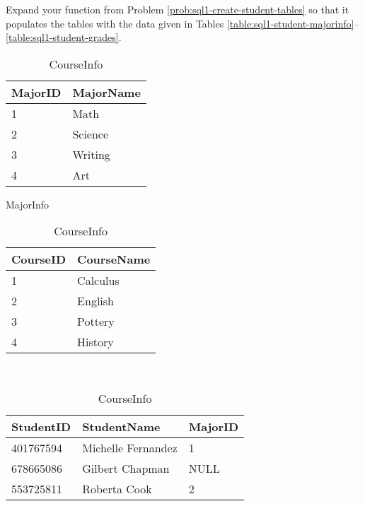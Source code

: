 \begin{problem} %
Expand your function from Problem \ref{prob:sql1-create-student-tables} so that it populates the tables with the data given in Tables \ref{table:sql1-student-majorinfo}--\ref{table:sql1-student-grades}.

\begin{table}[H]
\begin{subtable}{0.55\textwidth}
    \centering
    \begin{subtable}{.45\textwidth}
        \centering
        \footnotesize
        \begin{tabular}{|l|l|}
            \hline MajorID & MajorName \\ \hline
            1 & Math \\
            2 & Science \\
            3 & Writing \\
            4 & Art \\ \hline
        \end{tabular}
        \caption{MajorInfo}
        \label{table:sql1-student-majorinfo}
    \end{subtable}
    \hfil
    \begin{subtable}{.45\textwidth}
        \centering
        \footnotesize
        \begin{tabular}{|l|l|}
            \hline CourseID & CourseName \\ \hline
            1 & Calculus \\
            2 & English \\
            3 & Pottery \\
            4 & History \\ \hline
        \end{tabular}
        \caption{CourseInfo}
        \label{table:sql1-student-courseinfo}
    \end{subtable}
    \\[1.em] %
    \begin{subtable}{\textwidth}
        \centering
        \footnotesize
        \begin{tabular}{|l|l|l|}
            \hline StudentID & StudentName & MajorID \\ \hline
            401767594 & Michelle Fernandez & 1 \\
            678665086 & Gilbert Chapman & NULL \\
            553725811 & Roberta Cook & 2 \\

\end{tabular}
\end{subtable}
\end{subtable}
\end{table}
\end{problem}
